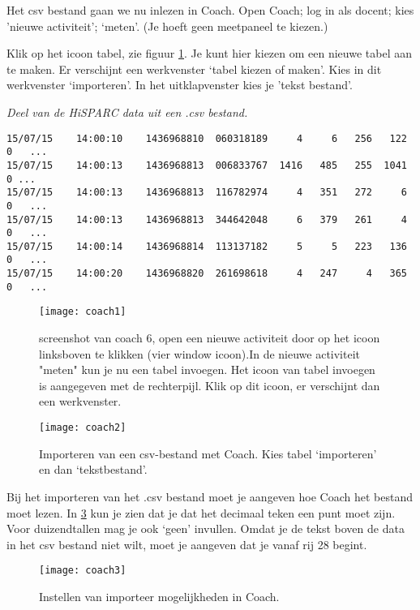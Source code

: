 Het csv bestand gaan we nu inlezen in Coach. Open Coach; log in als docent; kies 'nieuwe activiteit'; 
`meten'. (Je hoeft geen meetpaneel te kiezen.)

Klik op het icoon tabel, zie figuur \ref{fig:coach1}. Je kunt hier kiezen om een
nieuwe tabel aan te maken. Er verschijnt een werkvenster `tabel kiezen of maken'.
Kies in dit werkvenster `importeren'. In het uitklapvenster kies je 'tekst bestand'.

\textit{Deel van de HiSPARC data uit een .csv bestand.}
\begin{verbatim}
15/07/15	14:00:10	1436968810	060318189     4	    6	256	  122	0	...	
15/07/15	14:00:13	1436968813	006833767  1416	  485	255	 1041 0 ...
15/07/15	14:00:13	1436968813	116782974     4	  351	272	    6	0	...
15/07/15	14:00:13	1436968813	344642048     6	  379	261	    4	0	...	
15/07/15	14:00:14	1436968814	113137182     5	    5	223	  136	0	...	
15/07/15	14:00:20	1436968820	261698618     4	  247	  4	  365	0	...
\end{verbatim}

\begin{figure}
    \centering
    \texttt{[image: coach1]}
    \caption{screenshot van coach 6, open een nieuwe activiteit door op 
    het icoon linksboven te klikken (vier window icoon).In de nieuwe activiteit 
    "meten" kun je nu een tabel invoegen. Het icoon van tabel invoegen is 
    aangegeven met de rechterpijl. Klik op dit icoon, er verschijnt dan een werkvenster.}
    \label{fig:coach1}
\end{figure}

\begin{figure}
    \centering
    \texttt{[image: coach2]}
    \caption{Importeren van een csv-bestand met Coach. Kies tabel `importeren' en
    dan `tekstbestand'.}
    \label{fig:coach2}
\end{figure}

Bij het importeren van het .csv bestand moet je aangeven hoe Coach het bestand moet 
lezen. In \ref{fig:coach3} kun je zien dat je dat het decimaal teken
een punt moet zijn. Voor duizendtallen mag je ook `geen' invullen. Omdat je de tekst
boven de data in het csv bestand niet wilt, moet je aangeven dat je vanaf rij 
28 begint.

\begin{figure}
    \centering
    \texttt{[image: coach3]}
    \caption{Instellen van importeer mogelijkheden in Coach.}
    \label{fig:coach3}
\end{figure}
   
